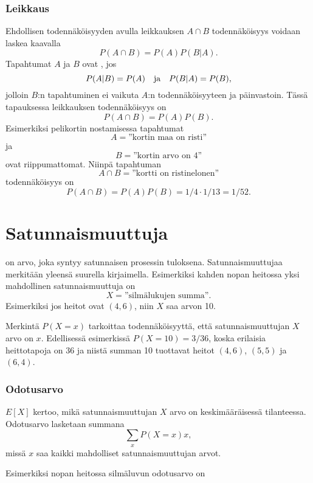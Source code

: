 \subsubsection{Leikkaus}


Ehdollisen todennäköisyyden avulla
leikkauksen $A \cap B$ todennäköisyys
voidaan laskea kaavalla
\[P(A \cap B)=P(A)P(B|A).\]
Tapahtumat $A$ ja $B$ ovat , jos
\[P(A|B)=P(A) \hspace{10px}\textrm{ja}\hspace{10px} P(B|A)=P(B),\]
jolloin $B$:n tapahtuminen ei vaikuta $A$:n
todennäköisyyteen ja päinvastoin.
Tässä tapauksessa leikkauksen
todennäköisyys on
\[P(A \cap B)=P(A)P(B).\]
Esimerkiksi pelikortin nostamisessa
tapahtumat
\[A = \textrm{''kortin maa on risti''}\]
ja
\[B = \textrm{''kortin arvo on 4''}\]
ovat riippumattomat.
Niinpä tapahtuman
\[A \cap B = \textrm{''kortti on ristinelonen''}\]
todennäköisyys on
\[P(A \cap B)=P(A)P(B)=1/4 \cdot 1/13 = 1/52.\]

\section{Satunnaismuuttuja}


 on arvo, joka syntyy satunnaisen
prosessin tuloksena.
Satunnaismuuttujaa merkitään yleensä
suurella kirjaimella.
Esimerkiksi kahden nopan heitossa yksi mahdollinen
satunnaismuuttuja on
\[X=\textrm{''silmälukujen summa''}.\]
Esimerkiksi jos heitot ovat $(4,6)$,
niin $X$ saa arvon 10.

Merkintä $P(X=x)$ tarkoittaa todennäköisyyttä,
että satunnaismuuttujan $X$ arvo on $x$.
Edellisessä esimerkissä $P(X=10)=3/36$,
koska erilaisia heittotapoja on 36
ja niistä summan 10 tuottavat heitot
$(4,6)$, $(5,5)$ ja $(6,4)$.

\subsubsection{Odotusarvo}


 $E[X]$ kertoo, mikä satunnaismuuttujan $X$
arvo on keskimääräisessä tilanteessa.
Odotusarvo lasketaan summana
\[\sum_x P(X=x)x,\]
missä $x$ saa kaikki mahdolliset satunnaismuuttujan arvot.

Esimerkiksi nopan heitossa silmäluvun odotusarvo on

